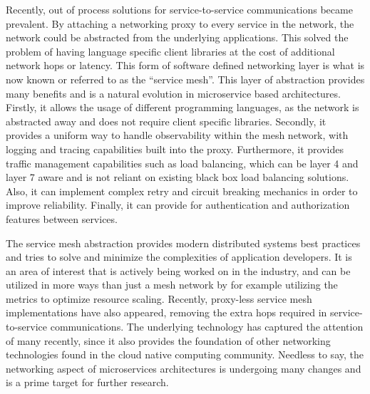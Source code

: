 Recently, out of process solutions for service-to-service communications became prevalent. By attaching a networking proxy to every service in the network, the network could be abstracted from the underlying applications. This solved the problem of having language specific client libraries at the cost of additional network hops or latency. This form of software defined networking layer is what is now known or referred to as the “service mesh”. This layer of abstraction provides many benefits\cite{lyft-envoy} and is a natural evolution in microservice based architectures. Firstly, it allows the usage of different programming languages, as the network is abstracted away and does not require client specific libraries. Secondly, it provides a uniform way to handle observability within the mesh network, with logging and tracing capabilities built into the proxy. Furthermore, it provides traffic management capabilities such as load balancing, which can be layer 4 and layer 7 aware and is not reliant on existing black box load balancing solutions. Also, it can implement complex retry and circuit breaking mechanics in order to improve reliability. Finally, it can provide for authentication and authorization features between services. 

The service mesh abstraction provides modern distributed systems best practices and tries to solve and minimize the complexities of application developers. It is an area of interest that is actively being worked on in the industry, and can be utilized in more ways than just a mesh network by for example utilizing the metrics to optimize resource scaling. Recently, proxy-less service mesh implementations have also appeared\cite{cilium-mesh}, removing the extra hops required in service-to-service communications. The underlying technology \cite{ebpf} has captured the attention of many recently, since it also provides the foundation of other networking technologies found in the cloud native computing community. Needless to say, the networking aspect of microservices architectures is undergoing many changes and is a prime target for further research.